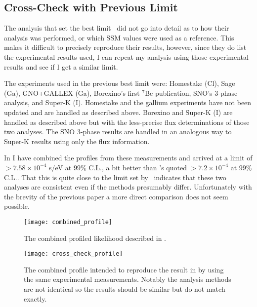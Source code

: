 \subsection{Cross-Check with Previous Limit}

The analysis that set the best limit~\cite{picoreti} did not go into detail as to how their analysis was performed, or which SSM values were used as a reference.
This makes it difficult to precisely reproduce their results, however, since they do list the experimental results used, I can repeat my analysis using those experimental results and see if I get a similar limit.

The experiments used in the previous best limit were: Homestake (Cl), Sage (Ga), GNO+GALLEX (Ga), Borexino's first $^7$Be publication, SNO's 3-phase analysis, and Super-K (I). 
Homestake and the gallium experiments have not been updated and are handled as described above.
Borexino and Super-K (I) are handled as described above but with the less-precise flux determinations of those two analyses. 
The SNO 3-phase results are handled in an analogous way to Super-K results using only the flux information.


In  I have combined the profiles from these measurements and arrived at a limit of $>7.58\times10^{-4}$ s/eV at $99\%$ C.L., a bit better than \cite{picoreti}'s quoted $>7.2\times10^{-4}$ at $99\%$ C.L..
That this is quite close to the limit set by~\cite{picoreti} indicates that these two analyses are consistent even if the methods presumably differ.
Unfortunately with the brevity of the previous paper a more direct comparison does not seem possible.

\begin{figure}
\centering
\texttt{[image: combined\_profile]}
\caption{The combined profiled likelihood described in .}
\label{fig:combined_profile}
\end{figure}

\begin{figure}
\centering
\texttt{[image: cross\_check\_profile]}
\caption{The combined profile intended to reproduce the result in \cite{picoreti} by using the same experimental measurements. Notably the analysis methods are not identical so the results should be similar but do not match exactly.}
\label{fig:cross_check_profile}
\end{figure}
